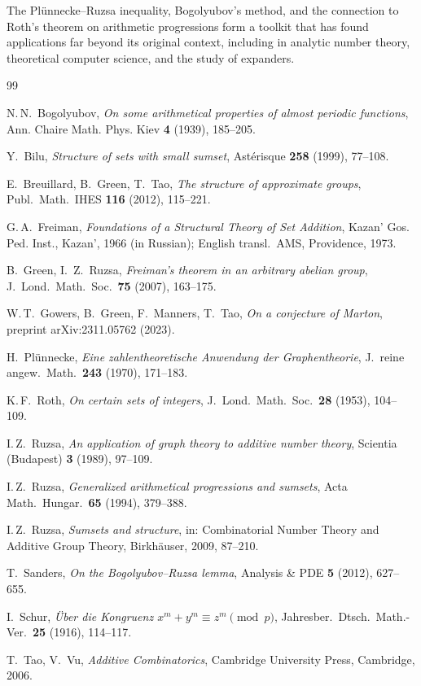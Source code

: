 \documentclass[12pt,a4paper]{amsart}
\theoremstyle{definition}
\theoremstyle{remark}
\begin{document}
The Plünnecke--Ruzsa inequality, Bogolyubov's method, and the connection to Roth's
theorem on arithmetic progressions form a toolkit that has found applications far
beyond its original context, including in analytic number theory, theoretical computer
science, and the study of expanders.

\begin{thebibliography}{99}

N.\,N.~Bogolyubov,
\textit{On some arithmetical properties of almost periodic functions},
Ann. Chaire Math. Phys. Kiev \textbf{4} (1939), 185--205.

Y.~Bilu,
\textit{Structure of sets with small sumset},
Ast\'erisque \textbf{258} (1999), 77--108.

E.~Breuillard, B.~Green, T.~Tao,
\textit{The structure of approximate groups},
Publ.\ Math.\ IHES \textbf{116} (2012), 115--221.

G.\,A.~Freiman,
\textit{Foundations of a Structural Theory of Set Addition},
Kazan' Gos. Ped. Inst., Kazan', 1966 (in Russian);
English transl.\ AMS, Providence, 1973.

B.~Green, I.~Z.~Ruzsa,
\textit{Freiman's theorem in an arbitrary abelian group},
J.\ Lond.\ Math.\ Soc.\ \textbf{75} (2007), 163--175.

W.\,T.~Gowers, B.~Green, F.~Manners, T.~Tao,
\textit{On a conjecture of Marton},
preprint arXiv:2311.05762 (2023).

H.~Pl\"unnecke,
\textit{Eine zahlentheoretische Anwendung der Graphentheorie},
J.\ reine angew.\ Math.\ \textbf{243} (1970), 171--183.

K.\,F.~Roth,
\textit{On certain sets of integers},
J.\ Lond.\ Math.\ Soc.\ \textbf{28} (1953), 104--109.

I.\,Z.~Ruzsa,
\textit{An application of graph theory to additive number theory},
Scientia (Budapest) \textbf{3} (1989), 97--109.

I.\,Z.~Ruzsa,
\textit{Generalized arithmetical progressions and sumsets},
Acta Math.\ Hungar.\ \textbf{65} (1994), 379--388.

I.\,Z.~Ruzsa,
\textit{Sumsets and structure},
in: Combinatorial Number Theory and Additive Group Theory,
Birkh\"auser, 2009, 87--210.

T.~Sanders,
\textit{On the Bogolyubov--Ruzsa lemma},
Analysis \& PDE \textbf{5} (2012), 627--655.

I.~Schur,
\textit{\"Uber die Kongruenz $x^m + y^m \equiv z^m \pmod{p}$},
Jahresber.\ Dtsch.\ Math.-Ver.\ \textbf{25} (1916), 114--117.

T.~Tao, V.~Vu,
\textit{Additive Combinatorics},
Cambridge University Press, Cambridge, 2006.

\end{thebibliography}
\end{document}
